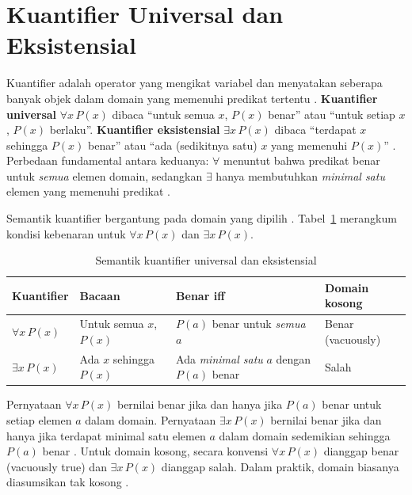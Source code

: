 \section{Kuantifier Universal dan Eksistensial}

Kuantifier adalah operator yang mengikat variabel dan menyatakan seberapa banyak objek dalam domain yang memenuhi predikat tertentu \cite{rosen2019,forallx}. \textbf{Kuantifier universal} $\forall x \, P(x)$ dibaca ``untuk semua $x$, $P(x)$ benar'' atau ``untuk setiap $x$, $P(x)$ berlaku''. \textbf{Kuantifier eksistensial} $\exists x \, P(x)$ dibaca ``terdapat $x$ sehingga $P(x)$ benar'' atau ``ada (sedikitnya satu) $x$ yang memenuhi $P(x)$'' \cite{copi2014,iep_predicate}. Perbedaan fundamental antara keduanya: $\forall$ menuntut bahwa predikat benar untuk \emph{semua} elemen domain, sedangkan $\exists$ hanya membutuhkan \emph{minimal satu} elemen yang memenuhi predikat \cite{wiki_fol,berkeley_fol}.

Semantik kuantifier bergantung pada domain yang dipilih \cite{rosen2019,forallx}. Tabel~\ref{tab:semantik-kuantifier} merangkum kondisi kebenaran untuk $\forall x \, P(x)$ dan $\exists x \, P(x)$.

\begin{table}[htbp]
\centering
\small
\begin{tabular}{|>{\raggedright\arraybackslash}p{2.4cm}|>{\raggedright\arraybackslash}p{3.2cm}|>{\raggedright\arraybackslash}p{3.6cm}|>{\raggedright\arraybackslash}p{2.2cm}|}
\hline
\textbf{Kuantifier} & \textbf{Bacaan} & \textbf{Benar iff} & \textbf{Domain kosong} \\
\hline
$\forall x \, P(x)$ & Untuk semua $x$, $P(x)$ & $P(a)$ benar untuk \emph{semua} $a$ & Benar (vacuously) \\
\hline
$\exists x \, P(x)$ & Ada $x$ sehingga $P(x)$ & Ada \emph{minimal satu} $a$ dengan $P(a)$ benar & Salah \\
\hline
\end{tabular}
\caption{Semantik kuantifier universal dan eksistensial \cite{rosen2019,olp_fol}}
\label{tab:semantik-kuantifier}
\end{table}

Pernyataan $\forall x \, P(x)$ bernilai benar jika dan hanya jika $P(a)$ benar untuk setiap elemen $a$ dalam domain. Pernyataan $\exists x \, P(x)$ bernilai benar jika dan hanya jika terdapat minimal satu elemen $a$ dalam domain sedemikian sehingga $P(a)$ benar \cite{olp_fol,setslogic}. Untuk domain kosong, secara konvensi $\forall x \, P(x)$ dianggap benar (vacuously true) dan $\exists x \, P(x)$ dianggap salah. Dalam praktik, domain biasanya diasumsikan tak kosong \cite{rosen2019}.

